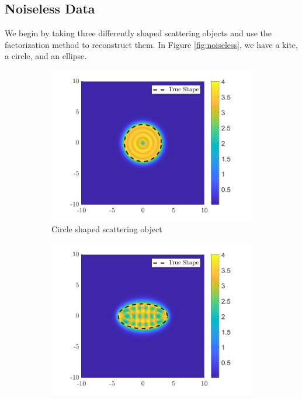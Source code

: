 \documentclass[]{article}
\begin{document}
			\subsection{Noiseless Data}
				 We begin by taking three differently shaped scattering objects and use the factorization method to reconstruct them. In Figure \ref{fig:noiseless}, we have a kite, a circle, and an ellipse.
				\begin{figure}[h]
					\centering
					\begin{subfigure}{.3\textwidth}
						\centering
						\includegraphics[width = \textwidth]{Numeric Simulations/Images/Circle-Reconstructed}
						\caption{Circle shaped scattering object}
					\end{subfigure}
					\begin{subfigure}{.3\textwidth}
						\centering
						\includegraphics[width = \textwidth]{Numeric Simulations/Images/ellipse-Reconstructed}

\end{subfigure}
\end{figure}
\end{document}
